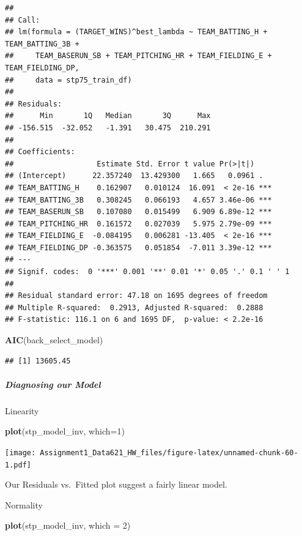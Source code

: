 \documentclass[
]{article}
\newenvironment{Shaded}{\begin{snugshade}}{\end{snugshade}}
\newcommand{\AttributeTok}[1]{\textcolor[rgb]{0.13,0.29,0.53}{#1}}
\newcommand{\DecValTok}[1]{\textcolor[rgb]{0.00,0.00,0.81}{#1}}
\newcommand{\FunctionTok}[1]{\textcolor[rgb]{0.13,0.29,0.53}{\textbf{#1}}}
\newcommand{\NormalTok}[1]{#1}
\begin{document}
\begin{verbatim}
## 
## Call:
## lm(formula = (TARGET_WINS)^best_lambda ~ TEAM_BATTING_H + TEAM_BATTING_3B + 
##     TEAM_BASERUN_SB + TEAM_PITCHING_HR + TEAM_FIELDING_E + TEAM_FIELDING_DP, 
##     data = stp75_train_df)
## 
## Residuals:
##      Min       1Q   Median       3Q      Max 
## -156.515  -32.052   -1.391   30.475  210.291 
## 
## Coefficients:
##                   Estimate Std. Error t value Pr(>|t|)    
## (Intercept)      22.357240  13.429300   1.665   0.0961 .  
## TEAM_BATTING_H    0.162907   0.010124  16.091  < 2e-16 ***
## TEAM_BATTING_3B   0.308245   0.066193   4.657 3.46e-06 ***
## TEAM_BASERUN_SB   0.107080   0.015499   6.909 6.89e-12 ***
## TEAM_PITCHING_HR  0.161572   0.027039   5.975 2.79e-09 ***
## TEAM_FIELDING_E  -0.084195   0.006281 -13.405  < 2e-16 ***
## TEAM_FIELDING_DP -0.363575   0.051854  -7.011 3.39e-12 ***
## ---
## Signif. codes:  0 '***' 0.001 '**' 0.01 '*' 0.05 '.' 0.1 ' ' 1
## 
## Residual standard error: 47.18 on 1695 degrees of freedom
## Multiple R-squared:  0.2913, Adjusted R-squared:  0.2888 
## F-statistic: 116.1 on 6 and 1695 DF,  p-value: < 2.2e-16
\end{verbatim}

\begin{Shaded}
\begin{Highlighting}[]
\FunctionTok{AIC}\NormalTok{(back\_select\_model)}
\end{Highlighting}
\end{Shaded}

\begin{verbatim}
## [1] 13605.45
\end{verbatim}

\subparagraph{Diagnosing our Model}\label{diagnosing-our-model-4}

Linearity

\begin{Shaded}
\begin{Highlighting}[]
\FunctionTok{plot}\NormalTok{(stp\_model\_inv, }\AttributeTok{which=}\DecValTok{1}\NormalTok{)}
\end{Highlighting}
\end{Shaded}

\texttt{[image: Assignment1\_Data621\_HW\_files/figure-latex/unnamed-chunk-60-1.pdf]}

Our Residuals vs.~Fitted plot suggest a fairly linear model.

Normality

\begin{Shaded}
\begin{Highlighting}[]
\FunctionTok{plot}\NormalTok{(stp\_model\_inv, }\AttributeTok{which =} \DecValTok{2}\NormalTok{)}
\end{Highlighting}
\end{Shaded}
\end{document}
